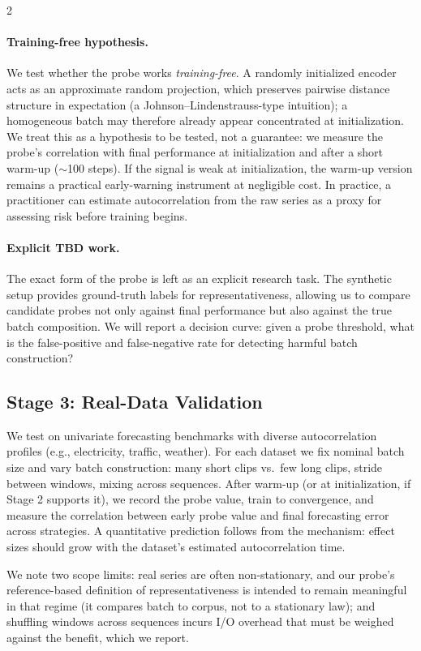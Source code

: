 \documentclass[10pt]{article}
\theoremstyle{remark}
\begin{document}
\begin{multicols*}{2}
\paragraph{Training-free hypothesis.}
We test whether the probe works \emph{training-free}. A randomly initialized encoder acts as an approximate random projection, which preserves pairwise distance structure in expectation (a Johnson--Lindenstrauss-type intuition); a homogeneous batch may therefore already appear concentrated at initialization. We treat this as a hypothesis to be tested, not a guarantee: we measure the probe's correlation with final performance at initialization and after a short warm-up ($\sim$100 steps). If the signal is weak at initialization, the warm-up version remains a practical early-warning instrument at negligible cost. In practice, a practitioner can estimate autocorrelation from the raw series as a proxy for assessing risk before training begins.

\paragraph{Explicit TBD work.}
The exact form of the probe is left as an explicit research task. The synthetic setup provides ground-truth labels for representativeness, allowing us to compare candidate probes not only against final performance but also against the true batch composition. We will report a decision curve: given a probe threshold, what is the false-positive and false-negative rate for detecting harmful batch construction?

\subsection{Stage 3: Real-Data Validation}

We test on univariate forecasting benchmarks with diverse autocorrelation profiles (e.g., electricity, traffic, weather). For each dataset we fix nominal batch size and vary batch construction: many short clips vs.\ few long clips, stride between windows, mixing across sequences. After warm-up (or at initialization, if Stage 2 supports it), we record the probe value, train to convergence, and measure the correlation between early probe value and final forecasting error across strategies. A quantitative prediction follows from the mechanism: effect sizes should grow with the dataset's estimated autocorrelation time.

We note two scope limits: real series are often non-stationary, and our probe's reference-based definition of representativeness is intended to remain meaningful in that regime (it compares batch to corpus, not to a stationary law); and shuffling windows across sequences incurs I/O overhead that must be weighed against the benefit, which we report.


\end{multicols*}
\end{document}
